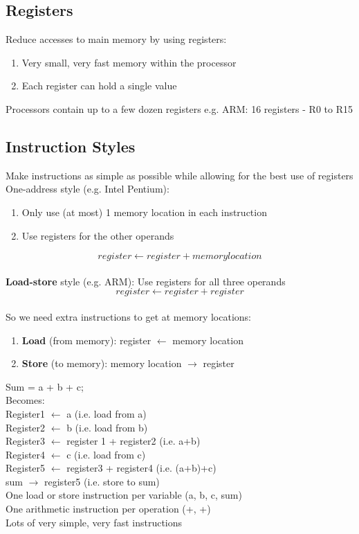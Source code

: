 \documentclass{article}
\begin{document}
\subsection{Registers}
Reduce accesses to main memory by using registers:
\begin{enumerate}
\item Very small, very fast memory within the processor
\item Each register can hold a single value
\end{enumerate}
Processors contain up to a few dozen registers e.g. ARM: 16 registers - R0 to R15

\subsection{Instruction Styles}
Make instructions as simple as possible while allowing for the best use of registers\\
One-address style (e.g. Intel Pentium):
\begin{enumerate}
\item Only use (at most) 1 memory location in each instruction
\item Use registers for the other operands
\end{enumerate}
\[register \leftarrow register + memory location\]\\
\textbf{Load-store} style (e.g. ARM): Use registers for all three operands\\
\[register \leftarrow register + register\]\\
So we need extra instructions to get at memory locations:
\begin{enumerate}
\item \textbf{Load} (from memory): register \(\leftarrow\) memory location
\item \textbf{Store} (to memory): memory location \(\rightarrow\) register
\end{enumerate}
Sum = a + b + c;\\
Becomes:\\
Register1 \(\leftarrow\) a                      (i.e. load from a)\\
Register2 \(\leftarrow\) b                      (i.e. load from b)\\
Register3 \(\leftarrow\) register 1 + register2 (i.e. a+b)\\
Register4 \(\leftarrow\) c                      (i.e. load from c)\\
Register5 \(\leftarrow\) register3 + register4  (i.e. (a+b)+c)\\
sum \(\rightarrow\) register5                   (i.e. store to sum)\\
One load or store instruction per variable (a, b, c, sum)\\
One arithmetic instruction per operation (+, +)\\
Lots of very simple, very fast instructions
\end{document}
